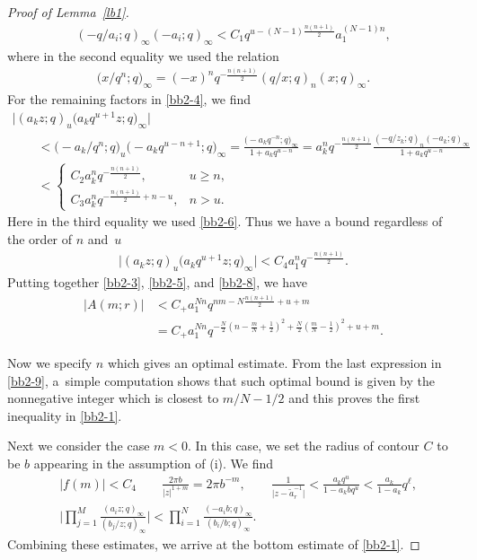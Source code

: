 \documentclass[11pt]{article}
\numberwithin{equation}{section}
\numberwithin{equation}{section}
\def\i{\infty}
\begin{document}
\begin{proof}[Proof of Lemma~\ref{lb1}]
\begin{gather}
 (-q/a_i;q)_\infty (-a_i;q)_\i
 <C_1 q^{u-(N-1)\frac{n(n+1)}{2}} a_{1}^{(N-1)n},\label{bb2-5}
\end{gather}
 where
 in the second equality we used the relation
 \begin{align}
 \label{bb2-6}
 \big(x/q^n;q\big)_\i=(-x)^n q^{-\frac{n(n+1)}{2}}
 (q/x;q)_{n}(x;q)_{\i}.
 \end{align}
 For the remaining factors in \eqref{bb2-4}, we find
 \begin{gather*}%
 \big|(a_k z;q)_u \big(a_k q^{u+1}z;q\big)_{\i}\big| \\
 \qquad <\bigl(-a_k /q^n;q\bigr)_u\bigl(-a_k q^{u-n+1};q\bigr)_{\i}=\frac{\bigl(-a_k q^{-n};q\bigr)_\infty}{1+a_k q^{u-n}} =
 a_k^n q^{-\frac{n(n+1)}{2}}\!\frac{(-q/z_k;q)_n(-a_k;q)_{\infty}}{1+a_kq^{u-n}}\\
 \qquad <
 \begin{cases}
 C_2 a_k^n q^{-\frac{n(n+1)}{2}}, & u\ge n,
 \\
 C_3 a_k^n q^{-\frac{n(n+1)}{2}+n-u}, & n>u.
 \end{cases}
 \end{gather*}
 Here in the third equality we used \eqref{bb2-6}.
 Thus we have a bound regardless of the order of $n$ and~$u$
 \begin{align}
 \label{bb2-8}
 \big|(a_k z;q)_u\big(a_kq^{u+1}z;q\big)_{\i}\big|
 <
 C_4 a_{1}^nq^{-\frac{n(n+1)}{2}}.
 \end{align}
 Putting together \eqref{bb2-3}, \eqref{bb2-5}, and \eqref{bb2-8}, we have
 \begin{align}
 \label{bb2-9}
 |A(m;r)|&<C_+ a_{1}^{Nn} q^{nm-N\frac{n(n+1)}{2}+u+m}
 \nonumber\\
 &=C_+ a_{1}^{Nn}q^{-\frac{N}{2}\left(n-\frac{m}{N}+\frac12\right)^2+\frac{N}{2}\left(\frac{m}{N}-\frac12\right)^2+u+m}.
 \end{align}

 Now we specify $n$ which gives an optimal estimate.
 From the last expression in \eqref{bb2-9}, a~simple computation shows that such optimal bound is given by the nonnegative integer which is closest to $m/N-1/2$ and this proves the first inequality in \eqref{bb2-1}.


 Next we consider the case $m<0$. In this case, we set the radius of contour $C$ to be $b$ appearing in the assumption of (i). We find{\samepage
 \begin{align*}
 &|f(m)|<C_4
 \qquad
 \frac{2\pi b}{|z|^{1+m}}=2\pi b^{-m},
 \qquad
 \frac{1}{\big|z-\tilde{a}^{-1}_r\big|}
 <\frac{a_k q^{u}}{1-a_k bq^{u}}
 <\frac{a_k}{1-a_k} q^{\ell},
 \nonumber\\
 &\Bigg|\prod_{j=1}^M\frac{(a_iz;q)_{\i}}{(b_j/z;q)_{\i}}\Bigg|
 <\prod_{i=1}^N\frac{(-a_ib;q)_\i}{(b_i/b;q)_{\i}}.
 \end{align*}
 Combining these estimates, we arrive at the bottom estimate of \eqref{bb2-1}.}



\end{proof}
\end{document}
